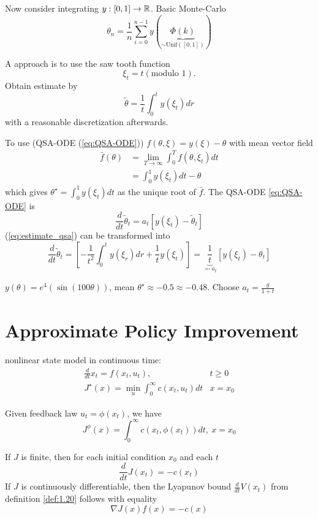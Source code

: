 Now consider integrating \(y:[0,1]\to\mathbb{R}\). Basic Monte-Carlo 
\begin{equation}\label{eq:monte-carlo-integration}
    \theta_n=\frac{1}{n}\sum_{i=0}^{n-1} y(\underbrace{\Phi(k)}_{\sim\text{Unif}([0,1])})
\end{equation} 

A  approach is to use the saw tooth function 
\[\xi_t=t(\text{modulo 1}).\]
Obtain estimate by 
\begin{equation}\label{eq:estimate_qsa}\tilde{\theta}=\frac{1}{t}\int_0^ty(\xi_t)dr\end{equation}
with a reasonable discretization afterwards.

To use (QSA-ODE (\ref{eq:QSA-ODE})) \(f(\theta,\xi)=y(\xi)-\theta\) with mean vector field 
\begin{align*}
    \bar{f}(\theta)&=\lim_{T\to\infty}\int_0^T f(\theta,\xi_t)dt\\
        &=\int_0^1 y(\xi_t)dt-\theta
\end{align*}
which gives \(\theta^\star=\int_0^1y(\xi_t)dt\) as the unique root of \(\bar{f}\). 
The QSA-ODE \ref{eq:QSA-ODE}
is \[\frac{d}{dt}\tilde{\theta}_t=a_t[y(\xi_t)-\tilde{\theta}_t]\]
(\ref{eq:estimate_qsa}) can be transformed into 
\begin{equation}
    \frac{d}{dt}\tilde{\theta}_t=\left[-\frac{1}{t^2}\int_0^t y(\xi_r)dr+\frac{1}{t}y(\xi_t)\right]=\underbrace{\frac{1}{t}}_{\eqqcolon a_t}\left[y(\xi_t)-\theta_t\right]
\end{equation}

\begin{example}
    \(y(\theta)=e^{4}(\sin(100\theta))\), mean \(\theta^\star\approx-0.5\approx -0.48\).
    Choose \(a_t=\frac{g}{1+t}\)
\end{example}

\section{Approximate Policy Improvement}

nonlinear state model in continuous time:
\begin{align}
    \frac{d}{dt}x_t=f(x_t,u_t),& t\geq 0\\
    J^\star(x)=\min_{\underbar{u}}\int_0^\infty c(x_t,u_t)dt & x=x_0
\end{align}

Given feedback law \(u_t=\phi(x_t)\), we have 
\begin{equation}
    J^\phi(x)=\int_0^\infty c(x_t,\phi(x_t))dt,\ x=x_0
\end{equation}
\begin{proposition}\label{prop:34}
    If \(J\) is finite, then for each initial condition \(x_0\) and each \(t\)
    \[\frac{d}{dt}J(x_t)=-c(x_t)\]
    If \(J\) is continuously differentiable, then the Lyapunov bound \(\frac{d}{dt} V(x_t)\)
    from definition \ref{def:1.20}  follows with equality
    \[\nabla J(x)f(x)=-c(x)\]
\end{proposition}

